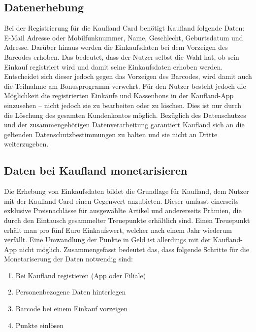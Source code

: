 \subsection{Datenerhebung}
Bei der Registrierung für die Kaufland Card benötigt Kaufland folgende Daten: E-Mail Adresse oder Mobilfunknummer, Name, Geschlecht, Geburtsdatum und Adresse. Darüber hinaus werden die Einkaufsdaten bei dem Vorzeigen des Barcodes erhoben. Das bedeutet, dass der Nutzer selbst die Wahl hat, ob sein Einkauf registriert wird und damit seine Einkaufsdaten erhoben werden. Entscheidet sich dieser jedoch gegen das Vorzeigen des Barcodes, wird damit auch die Teilnahme am Bonusprogramm verwehrt. Für den Nutzer besteht jedoch die Möglichkeit die registrierten Einkäufe und Kassenbons in der Kaufland-App einzusehen -- nicht jedoch sie zu bearbeiten oder zu löschen. Dies ist nur durch die Löschung des gesamten Kundenkontos möglich. \cite{Kaufland_FAQ} Bezüglich des Datenschutzes und der zusammengehörigen Datenverarbeitung garantiert Kaufland sich an die geltenden Datenschutzbestimmungen zu halten und sie nicht an Dritte weiterzugeben. \cite{Kaufland_Rechtliches} 

\subsection{Daten bei Kaufland monetarisieren}
Die Erhebung von Einkaufsdaten bildet die Grundlage für Kaufland, dem Nutzer mit der Kaufland Card einen Gegenwert anzubieten. Dieser umfasst einerseits exklusive Preisnachlässe für ausgewählte Artikel und andererseits Prämien, die durch den Eintausch gesammelter Treuepunkte erhältlich sind. Einen Treuepunkt erhält man pro fünf Euro Einkaufswert, welcher nach einem Jahr wiederum verfällt. Eine Umwandlung der Punkte in Geld ist allerdings mit der Kaufland-App nicht möglich. \cite{Kaufland_FAQ} Zusammengefasst bedeutet das, dass folgende Schritte für die Monetariserung der Daten notwendig sind:

\begin{enumerate}
	\item Bei Kaufland registieren (App oder Filiale) 
	\item Personenbezogene Daten hinterlegen
	\item Barcode bei einem Einkauf vorzeigen
	\item Punkte einlösen
\end{enumerate}
